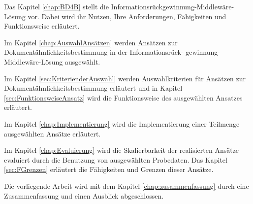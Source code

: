 Das Kapitel \ref{chap:BD4B} stellt die Informationsrückgewinnung-Middlewäre-Lösung vor. Dabei wird ihr Nutzen, Ihre Anforderungen, Fähigkeiten und Funktionsweise erläutert.

Im Kapitel \ref{chap:AuswahlAnsätzen} werden Ansätzen zur Dokumentähnlichkeitsbestimmung in der Informationsrück-
gewinnung-Middlewäre-Lösung ausgewählt. 

Im Kapitel \ref{sec:KriterienderAuswahl} werden Auswahlkriterien für Ansätzen zur Dokumentähnlichkeitsbestimmung erläutert und in Kapitel \ref{sec:FunktionsweiseAnsatz} wird die Funktionsweise des ausgewählten Ansatzes erläutert.

Im Kapitel \ref{chap:Implementierung} wird die Implementierung einer Teilmenge ausgewählten Ansätze erläutert.

Im Kapitel \ref{chap:Evaluierung} wird die Skalierbarkeit der realisierten Ansätze evaluiert durch die Benutzung von ausgewählten Probedaten. Das Kapitel  \ref{sec:FGrenzen} erläutert die Fähigkeiten und Grenzen dieser Ansätze.
 
Die vorliegende Arbeit wird mit dem Kapitel \ref{chap:zusammenfassung} durch eine Zusammenfassung und einen Ausblick abgeschlossen.

